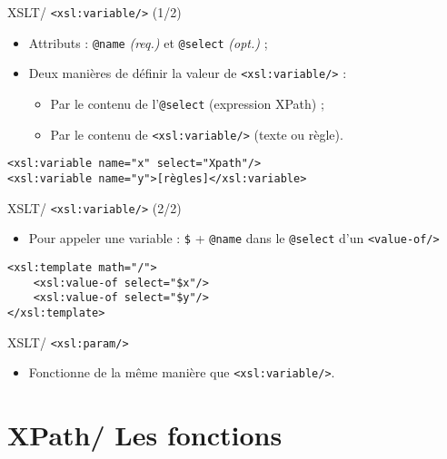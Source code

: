 \documentclass{beamer}
\begin{document}
    \begin{frame}[fragile]{XSLT/ \texttt{<xsl:variable/>} (1/2)}
        \Large
        \begin{itemize}
            \item Attributs : \texttt{@name} \textit{(req.)} et \texttt{@select} \textit{(opt.)} ;
            \bigskip
            \item Deux manières de définir la valeur de \texttt{<xsl:variable/>} :
            \begin{itemize}
            \Large
                \item Par le contenu de l'\texttt{@select} (expression XPath) ;
                \item Par le contenu de \texttt{<xsl:variable/>} (texte ou règle).
            \end{itemize}
        \end{itemize}
        \normalsize
        \begin{verbatim}
<xsl:variable name="x" select="Xpath"/>
<xsl:variable name="y">[règles]</xsl:variable>
        \end{verbatim}
    \end{frame}

    \begin{frame}[fragile]{XSLT/ \texttt{<xsl:variable/>} (2/2)}
        \Large
        \begin{itemize}
            \item  Pour appeler une variable : \texttt{\$} + \texttt{@name} dans le \texttt{@select} d'un \texttt{<value-of/>}
        \end{itemize}
        \normalsize
        \begin{verbatim}
<xsl:template math="/">
    <xsl:value-of select="$x"/>
    <xsl:value-of select="$y"/>
</xsl:template>
        \end{verbatim}
    \end{frame}

    \begin{frame}{XSLT/ \texttt{<xsl:param/>}}
        \Large
        \begin{itemize}
            \item Fonctionne de la même manière que \texttt{<xsl:variable/>}.
        \end{itemize}
    \end{frame}

    \section{XPath/ Les fonctions}
\end{document}
